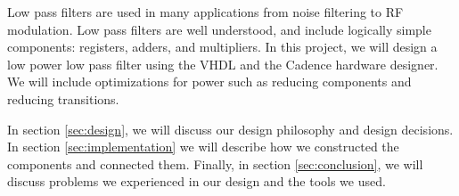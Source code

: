 
Low pass filters are used in many applications from noise filtering to RF modulation.  Low pass filters are well understood, and include logically simple components: registers, adders, and multipliers.  In this project, we will design a low power low pass filter using the VHDL and the Cadence hardware designer.  We will include optimizations for power such as reducing components and reducing transitions.

In section \ref{sec:design}, we will discuss our design philosophy and design decisions.  In section \ref{sec:implementation} we will describe how we constructed the components and connected them.  Finally, in section \ref{sec:conclusion}, we will discuss problems we experienced in our design and the tools we used.


